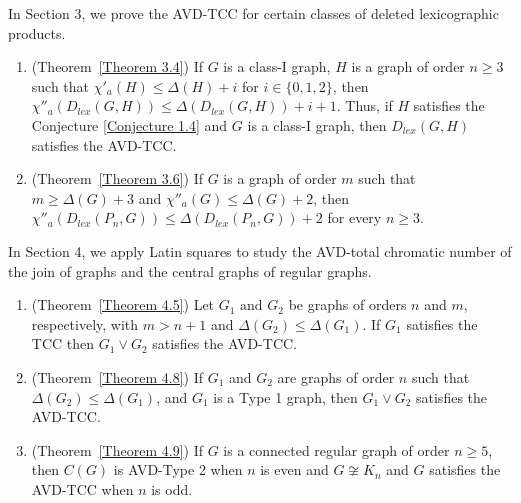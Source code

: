 \documentclass[12pt,reqno,a4paper]{amsart}
\theoremstyle{definition}
\theoremstyle{plain}
\begin{document}
In Section 3, we prove the AVD-TCC for certain classes of deleted lexicographic products.

\begin{enumerate}
    \item (Theorem~\ref{Theorem 3.4}) 
    If $G$ is a class-I graph, $H$ is a graph of order $n\geq 3$ such that $\chi'_{a}(H)\leq \Delta(H)+i$ for $i\in \{0,1,2\}$, then $\chi''_{a}(D_{lex}(G, H))\leq \Delta(D_{lex}(G, H)) +i+1$.
    Thus, if $H$ satisfies the
    Conjecture \ref{Conjecture 1.4} and $G$ is a class-I graph, then 
    $D_{lex}(G, H)$ satisfies the AVD-TCC.
    \item (Theorem~\ref{Theorem 3.6}) If $G$ is a graph of order $m$ such that $m\geq \Delta(G)+3$ and $\chi''_{a}(G)\leq \Delta(G)+2$, then $\chi''_{a}(D_{lex}(P_n, G))\leq \Delta(D_{lex}(P_n, G))+2$ for every $n\geq 3$. 
    
\end{enumerate} 

In Section 4, we apply Latin squares to study the AVD-total chromatic number of the join of graphs and the central graphs of regular graphs.

\begin{enumerate}
     \item (Theorem~\ref{Theorem 4.5}) Let $G_1$ and $G_2$ be graphs of orders $n$ and $m$, respectively, with $m>n+1$ and $\Delta(G_2)\leq \Delta(G_1)$. If $G_1$ satisfies the TCC then $G_1\vee G_2$ satisfies the AVD-TCC.

    \item (Theorem~\ref{Theorem 4.8}) If $G_1$ and $G_2$ are graphs of order $n$ such that $\Delta(G_2)\leq \Delta(G_1)$, and $G_1$ is a Type 1 graph, then $G_1\vee G_2$ satisfies the AVD-TCC. 

    \item (Theorem~\ref{Theorem 4.9}) If $G$ is a connected regular graph of order $n\geq 5$, then $C(G)$ is AVD-Type 2 when $n$ is even and $G\not\cong K_n$ and $G$ satisfies the AVD-TCC when $n$ is odd. 
\end{enumerate}
\end{document}
